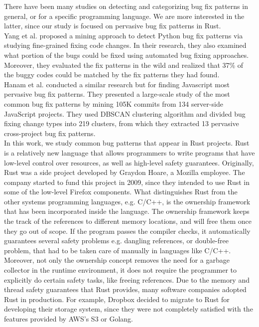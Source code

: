 \documentclass{article}
\begin{document}
There have been many studies on detecting and categorizing bug fix patterns in general, or for a specific programming language. We are more interested in the latter, since
our study is focused on pervasive bug fix patterns in Rust. \\
Yang et al. proposed a mining approach to detect Python bug fix patterns via studying
fine-grained fixing code changes. In their research, they also examined what portion of the bugs
could be fixed using automated bug fixing approaches. Moreover, they evaluated the fix patterns in
the wild and realized that 37\% of the buggy codes could be matched by the fix patterns they had
found. \\
Hanam et al. conducted a similar research but for finding Javascript most pervasive bug fix
patterns. They presented a large-scale study of the most common bug fix patterns by mining 105K
commits from 134 server-side JavaScript projects. They used DBSCAN clustering algorithm
and divided bug fixing change types into 219 clusters, from which they extracted 13 pervasive
cross-project bug fix patterns. \\
In this work, we study common bug patterns that appear in Rust projects. Rust is a relatively new language that allows programmers to write programs that have low-level
control over resources, as well as high-level safety guarantees. Originally, Rust was a side
project developed by Graydon Hoare, a Mozilla employee. The company started to fund this project
in 2009, since they intended to use Rust in some of the low-level Firefox components.
What distinguishes Rust from the other systems programming languages, e.g. C/C++, is the
ownership framework that has been incorporated inside the language. The ownership framework keeps the track of the references to different memory locations, and will free them once they
go out of scope. If the program passes the compiler checks, it automatically guarantees several
safety problems e.g. dangling references, or double-free problem, that had to be taken care of
manually in languages like C/C++. Moreover, not only the ownership concept removes the
need for a garbage collector in the runtime environment, it does not require the programmer to
explicitly do certain safety tasks, like freeing references.
Due to the memory and thread safety guarantees that Rust provides, many software companies
adopted Rust in production. For example, Dropbox decided to migrate to Rust for developing their
storage system, since they were not completely satisfied with the features provided by AWS’s S3 or
Golang.
\end{document}
